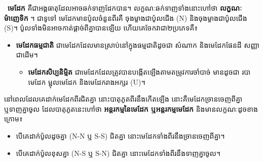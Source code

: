 \tanbgdivider

\noindent\hspace*{0.6cm}\faCaretRight~\textbf{\textcolor{brownheader}{មេដែក}} គឺជាអង្គធាតុដែលអាចឆក់ទាញដែកបាន។
លក្ខណៈឆក់ទាញទាំងនោះហៅថា \textbf{លក្ខណៈម៉ាញេទិក}
។ ជាទូទៅ មេដែកមានប៉ូលចំនួនពីរគឺ
ចុងម្ខាងជាប៉ូលជើង ({\englishfont N})
និងចុងម្ខាងជាប៉ូលជើង ({\englishfont S})។
ប៉ូលទាំងមិនអាចកាត់ផ្តាច់ពីគ្នាបានឡើយ
ហើយគេចែកវាជា២ប្រភេទគឺ៖

\noindent
\begin{minipage}[t]{0.55\textwidth}
	\raggedright
	\begin{itemize}[label={\textcolor{brownheader}{\faCaretRight}}]
		\item \textbf{មេដែកធម្មជាតិ} ជាមេដែកដែលមានស្រាប់នៅក្នុងធម្មជាតិដូចជា សំណាក  និងមេដែកផែនដី សញ្ញាជាដើម។
	\begin{itemize}[label={\textcolor{brownheader}{\faCaretRight}}]
		\item \textbf{មេដែកសិប្បនិម្មិត} ជាមេដែកដែលត្រូវបានបង្កើតឡើងតាមតម្រូវការចាំបាច់ មានដូចជា របាមេដែក ម្ជុលមេដែក និងមេដែករាងអក្សរ ({\englishfont U})។
	\end{itemize}
	\end{itemize}
	នៅពេលដែលគេដាក់មេដែកពីរជិតគ្នា
	នោះបាតុភូតពីរនឹងកើតឡើង
	នោះគឺមេដែកច្រានចេញពីគ្នា ឬទាញគ្នាចូល
	ដែលបាតុភូតនេះហៅថា
	\textbf{អន្តរកម្មនៃមេដែក ឬអន្តរកម្មមេដែក}
	និងមានលក្ខណៈដូចខាងក្រោម៖
	\begin{itemize}[label={\textcolor{brownheader}{\faCaretRight}}]
		\item បើគេដាក់ប៉ូលដូចគ្នា ({\englishfont N-N} ឬ {\englishfont S-S}) ជិតគ្នា នោះមេដែកទាំងពីរនឹងច្រានចេញពីគ្នា។
		\item បើគេដាក់ប៉ូលខុសគ្នា ({\englishfont N-S} ឬ {\englishfont S-N}) ជិតគ្នា នោះមេដែកទាំងពីរនឹងទាញគ្នាចូល។
	\end{itemize}
	\end{minipage}%
\hfill
\begin{minipage}[t]{0.40\textwidth}
	\vspace{0pt}
	\vspace{0.75mm}
\end{minipage}

